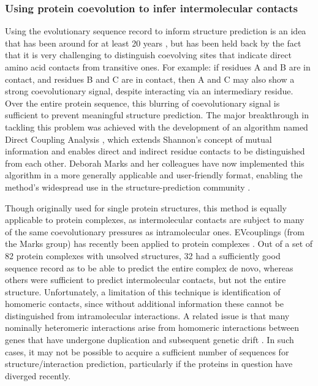 \documentclass[a4paper,11pt,twoside,openright]{scrbook}
\begin{document}
\subsubsection{Using protein coevolution to infer intermolecular contacts}
Using the evolutionary sequence record to inform structure prediction is an idea that has been around for at least 20 years \cite{Altschuh1987}, but has been held back by the fact that it is very challenging to distinguish coevolving sites that indicate direct amino acid contacts from transitive ones. For example: if residues A and B are in contact, and residues B and C are in contact, then A and C may also show a strong coevolutionary signal, despite interacting via an intermediary residue. Over the entire protein sequence, this blurring of coevolutionary signal is sufficient to prevent meaningful structure prediction. The major breakthrough in tackling this problem was achieved with the development of an algorithm named Direct Coupling Analysis \cite{Weigt2009,Lunt2010}, which extends Shannon's concept of mutual information \cite{Shannon1948} and enables direct and indirect residue contacts to be distinguished from each other. Deborah Marks and her colleagues have now implemented this algorithm in a more generally applicable and user-friendly format, enabling the method’s widespread use in the structure-prediction community \cite{Marks2011,Marks2012,Hopf2014}.

Though originally used for single protein structures, this method is equally applicable to protein complexes, as intermolecular contacts are subject to many of the same coevolutionary pressures as intramolecular ones. EVcouplings (from the Marks group) has recently been applied to protein complexes \cite{Hopf2014}. Out of a set of 82 protein complexes with unsolved structures, 32 had a sufficiently good sequence record as to be able to predict the entire complex de novo, whereas others were sufficient to predict intermolecular contacts, but not the entire structure. Unfortunately, a limitation of this technique is identification of homomeric contacts, since without additional information these cannot be distinguished  from intramolecular interactions. A related issue is that many nominally heteromeric interactions arise from homomeric interactions between genes that have undergone duplication and subsequent genetic drift \cite{Wagner2001,Wagner2003,Fokkens2012}. In such cases, it may not be possible to acquire a sufficient number of sequences for structure/interaction prediction, particularly if the proteins in question have diverged recently.
\end{document}
